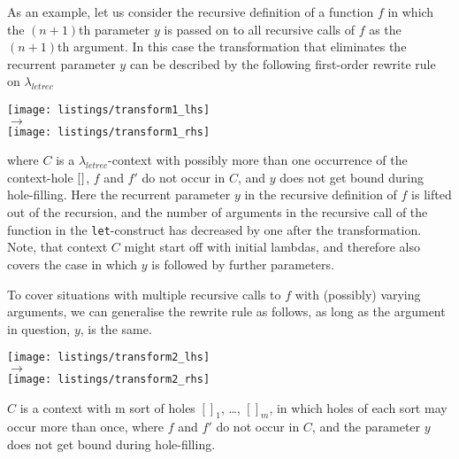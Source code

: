\documentclass[submission,copyright,creativecommons]{eptcs}
\newcommand{\lambdaletrec}{\ensuremath{\lambda_\textit{letrec}}}
\newcommand{\cxthole}{[\hspace*{0.5pt}]}
\newcommand{\bvar}{y}
\newcommand{\sred}{\rightarrow}
\newcommand{\nbd}{\nobreakdash}
\renewcommand\;{\,}
\begin{document}
As an example, let us consider the recursive definition of a function $f$ in
which the $(n+1)$th parameter $y$ is passed on to all recursive calls of $f$ as
the $(n+1)$th argument.
In this case the transformation that eliminates the recurrent parameter $y$
can be described by the following first-order rewrite rule on \lambdaletrec
\begin{samepage}
\begin{flushleft}
\vspace*{-0.5ex}
  \hspace*{6ex}\texttt{[image: listings/transform1\_lhs]}
  \nopagebreak[4]\\[-0.5ex]
  \hspace*{9ex}$\sred$
  \nopagebreak[4]\\[0.5ex]
  \hspace*{6ex}\texttt{[image: listings/transform1\_rhs]}
\end{flushleft}
\end{samepage}
\vspace{-0.5ex}
where $C$ is a \lambdaletrec\nbd-context with possibly more than one occurrence of the context-hole $\cxthole$,
$f$ and $f'$ do not occur in $C$, and $\bvar$ does not get bound during hole-filling.
Here the recurrent parameter $\bvar$ in the recursive definition of $f$ is lifted out
of the recursion, and the number of arguments in the recursive call of the function in
the {\tt let}\nbd-construct has decreased by one after the transformation.
Note, that context $C$ might start off with initial lambdas, and therefore
also covers the case in which $y$ is followed by further parameters.

To cover situations with multiple recursive calls to $f$ with (possibly)
varying arguments, we can generalise the rewrite rule as follows, as long as
the argument in question, $y$, is the same.
\begin{flushleft}
\vspace*{-0.5ex}
  \hspace*{6ex}\texttt{[image: listings/transform2\_lhs]}
  \\[-0.5ex]
  \hspace*{9ex}$\sred$
  \\[0.5ex]
  \hspace*{6ex}\texttt{[image: listings/transform2\_rhs]}
\end{flushleft}
$C$ is a context with m sort of holes $[]_1$, \ldots, $[]_m$, 
in which holes of each sort may occur more than once,
where $f$ and $f'$ do not occur in $C$, and
the parameter $y$ does not get bound during hole-filling.
\end{document}

